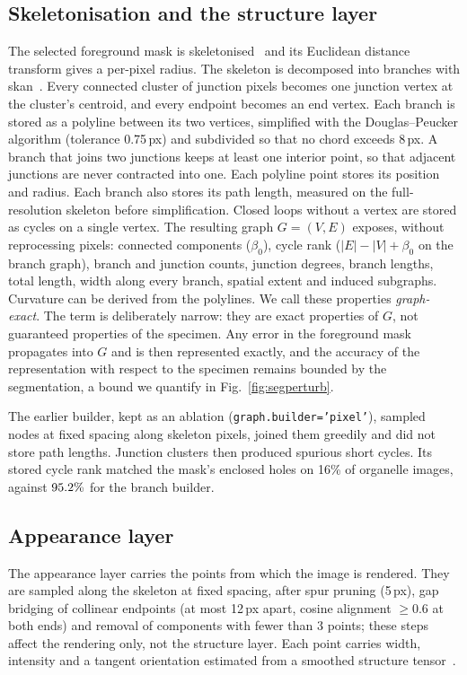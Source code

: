 \documentclass[10pt,a4paper]{article}
\begin{document}
\subsection{Skeletonisation and the structure layer}\label{sec:graph}
The selected foreground mask is skeletonised~\cite{lee} and its Euclidean
distance transform gives a per-pixel radius. The skeleton is decomposed into
branches with skan~\cite{skan}. Every connected cluster of junction pixels
becomes one junction vertex at the cluster's centroid, and every endpoint
becomes an end vertex. Each branch is stored as a polyline between its two
vertices, simplified with the Douglas--Peucker algorithm (tolerance
0.75\,px) and subdivided so that no chord exceeds 8\,px. A branch that joins
two junctions keeps at least one interior point, so that adjacent junctions
are never contracted into one. Each polyline point stores its position and
radius. Each branch also stores its path length, measured on the
full-resolution skeleton before simplification. Closed loops without a
vertex are stored as cycles on a single vertex. The resulting graph
$G=(V,E)$ exposes, without reprocessing pixels: connected components
($\beta_0$), cycle rank ($|E|-|V|+\beta_0$ on the branch graph), branch and
junction counts, junction degrees, branch lengths, total length, width
along every branch, spatial extent and induced subgraphs. Curvature can be
derived from the polylines. We call these properties \emph{graph-exact}.
The term is deliberately narrow: they are exact properties of $G$, not
guaranteed properties of the specimen. Any error in the foreground mask
propagates into $G$ and is then represented exactly, and the accuracy of the
representation with respect to the specimen remains bounded by the
segmentation, a bound we quantify in Fig.~\ref{fig:segperturb}.

The earlier builder, kept as an ablation (\texttt{graph.builder='pixel'}),
sampled nodes at fixed spacing along skeleton pixels, joined them greedily
and did not store path lengths. Junction clusters then produced spurious
short cycles. Its stored cycle rank matched the mask's enclosed holes on
16\% of organelle images, against $95.2\%$ for the branch
builder.

\subsection{Appearance layer}
The appearance layer carries the points from which the image is rendered.
They are sampled along the skeleton at fixed spacing, after spur pruning
(5\,px), gap bridging of collinear endpoints (at most 12\,px apart, cosine
alignment $\geq0.6$ at both ends) and removal of components with fewer than
3 points; these steps affect the rendering only, not the structure layer.
Each point carries width, intensity and a tangent orientation estimated from
a smoothed structure tensor~\cite{bigun1987structuretensor}.
\end{document}
